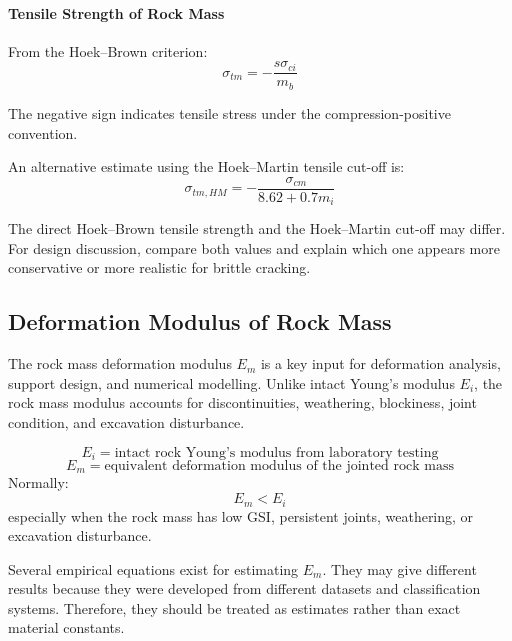 \paragraph{Tensile Strength of Rock Mass}

From the Hoek--Brown criterion:
\[
\sigma_{tm}
=
-\frac{s\sigma_{ci}}{m_b}
\]

The negative sign indicates tensile stress under the compression-positive convention.

An alternative estimate using the Hoek--Martin tensile cut-off is:
\[
\sigma_{tm,HM}
=
-\frac{\sigma_{cm}}{8.62+0.7m_i}
\]

\begin{notebox}
The direct Hoek--Brown tensile strength and the Hoek--Martin cut-off may differ.
For design discussion, compare both values and explain which one appears more conservative
or more realistic for brittle cracking.
\end{notebox}

\subsection{Deformation Modulus of Rock Mass}

The rock mass deformation modulus \(E_m\) is a key input for deformation analysis,
support design, and numerical modelling. Unlike intact Young's modulus \(E_i\), the
rock mass modulus accounts for discontinuities, weathering, blockiness, joint condition,
and excavation disturbance.

\begin{keybox}
\[
E_i = \text{intact rock Young's modulus from laboratory testing}
\]
\[
E_m = \text{equivalent deformation modulus of the jointed rock mass}
\]
Normally:
\[
E_m < E_i
\]
especially when the rock mass has low GSI, persistent joints, weathering, or excavation
disturbance.
\end{keybox}

Several empirical equations exist for estimating \(E_m\). They may give different results
because they were developed from different datasets and classification systems. Therefore,
they should be treated as estimates rather than exact material constants.

